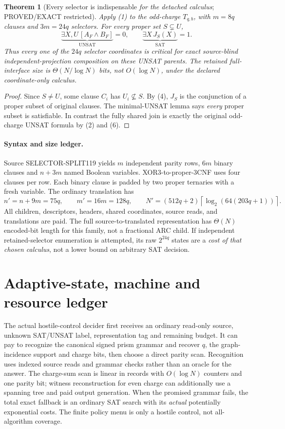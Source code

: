 \documentclass[11pt]{article}
\newtheorem{theorem}{Theorem}
\begin{document}
\begin{theorem}[Every selector is indispensable \emph{for the detached calculus}; PROVED/EXACT restricted]
Apply (1) to the odd-charge $T_{q,b}$, with $m=8q$ clauses and $3m=24q$ selectors. For every \emph{proper} set $S\subsetneq U$,
\[
 \underbrace{\exists X,U\,[A_F\wedge B_F]}_{\text{UNSAT}}=0,
 \qquad
 \underbrace{\exists X\,J_S(X)}_{\text{SAT}}=1.
 \tag{7}
\]
Thus every one of the $24q$ selector coordinates is critical for exact source-blind independent-projection composition on these UNSAT parents. The retained full-interface size is $\Theta(N/\log N)$ bits, not $O(\log N)$, under the declared coordinate-only calculus.
\end{theorem}
\begin{proof}
Since $S\ne U$, some clause $C_i$ has $U_i\not\subseteq S$. By (4), $J_S$ is the conjunction of a proper subset of original clauses. The minimal-UNSAT lemma says \emph{every} proper subset is satisfiable. In contrast the fully shared join is exactly the original odd-charge UNSAT formula by (2) and (6).
\end{proof}

\paragraph{Syntax and size ledger.}
Source SELECTOR-SPLIT119 yields $m$ independent parity rows, $6m$ binary clauses and $n+3m$ named Boolean variables. XOR3-to-proper-3CNF uses four clauses per row. Each binary clause is padded by two proper ternaries with a fresh variable. The ordinary translation has
\[
 n'=n+9m=75q,\qquad m'=16m=128q,\qquad
 N'=(512q+2)\left\lceil\log_2(64(203q+1))\right\rceil.
 \tag{8}
\]
All children, descriptors, headers, shared coordinates, source reads, and translations are paid. The full source-to-translated representation has $\Theta(N)$ encoded-bit length for this family, not a fractional ARC child. If independent retained-selector enumeration is attempted, its raw $2^{24q}$ states are a \emph{cost of that chosen calculus}, not a lower bound on arbitrary SAT decision.

\section{Adaptive-state, machine and resource ledger}
The actual hostile-control decider first receives an ordinary read-only source, unknown SAT/UNSAT label, representation tag and remaining budget. It can pay to recognize the canonical signed prism grammar and recover $q$, the graph-incidence support and charge bits, then choose a direct parity scan. Recognition uses indexed source reads and grammar checks rather than an oracle for the answer. The charge-sum scan is linear in records with $O(\log N)$ counters and one parity bit; witness reconstruction for even charge can additionally use a spanning tree and paid output generation. When the promised grammar fails, the total exact fallback is an ordinary SAT search with its \emph{actual} potentially exponential costs. The finite policy menu is only a hostile control, not all-algorithm coverage.
\end{document}
